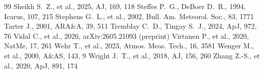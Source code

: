 \documentclass[twocolumn,twocolappendix,numberedappendix,appendixfloats]{openjournal}
\begin{document}
\begin{thebibliography}{99}
 Sheikh S.~Z., et al., 2025, AJ, 169, 118
 Steffes P.~G., DeBoer D.~R., 1994, Icarus, 107, 215
 Stephens G.~L., et al., 2002, Bull. Am. Meteorol. Soc., 83, 1771
 Tarter J., 2001, ARA\&A, 39, 511
 Tremblay C.~D., Tingay S.~J., 2024, ApJ, 972, 76
 Vidal C., et al., 2026, arXiv:2605.21093 (preprint)
 Virtanen P., et al., 2020, NatMe, 17, 261
 Wehr T., et al., 2023, Atmos. Meas. Tech., 16, 3581
 Wenger M., et al., 2000, A\&AS, 143, 9
 Wright J.~T., et al., 2018, AJ, 156, 260
 Zhang Z.-S., et al., 2020, ApJ, 891, 174
\end{thebibliography}
\end{document}
